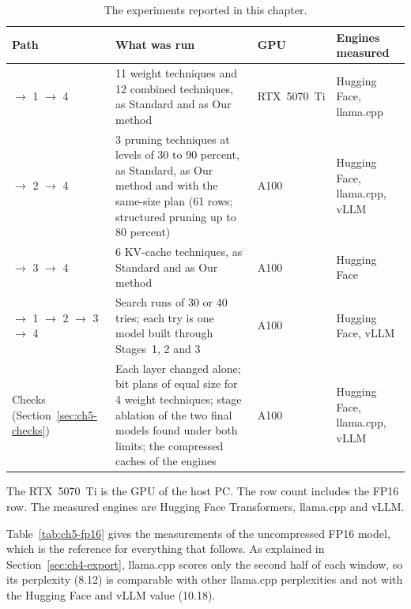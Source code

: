 \documentclass[
11pt, %
english, %
singlespacing, %
headsepline, %
]{MastersDoctoralThesis} %
\begin{document}
\begin{table}[htbp]
\centering
\small
\caption{The experiments reported in this chapter.}
\label{tab:ch5-experiments}
\renewcommand{\arraystretch}{1.2}
\begin{tabularx}{\textwidth}{>{\raggedright\arraybackslash}p{2.9cm}X>{\raggedright\arraybackslash}p{1.7cm}>{\raggedright\arraybackslash}p{2.7cm}}
\hline
\textbf{Path} & \textbf{What was run} & \textbf{GPU} & \textbf{Engines measured} \\
\hline
0 $\rightarrow$ 1 $\rightarrow$ 4 & 11 weight techniques and 12 combined techniques, as Standard and as Our method & RTX~5070~Ti & Hugging Face, llama.cpp \\
0 $\rightarrow$ 2 $\rightarrow$ 4 & 3 pruning techniques at levels of 30 to 90 percent, as Standard, as Our method and with the same-size plan (61 rows; structured pruning up to 80 percent) & A100 & Hugging Face, llama.cpp, vLLM \\
0 $\rightarrow$ 3 $\rightarrow$ 4 & 6 KV-cache techniques, as Standard and as Our method & A100 & Hugging Face \\
0 $\rightarrow$ 1 $\rightarrow$ 2 $\rightarrow$ 3 $\rightarrow$ 4 & Search runs of 30 or 40 tries; each try is one model built through Stages~1, 2 and 3 & A100 & Hugging Face, vLLM \\
Checks (Section~\ref{sec:ch5-checks}) & Each layer changed alone; bit plans of equal size for 4 weight techniques; stage ablation of the two final models found under both limits; the compressed caches of the engines & A100 & Hugging Face, llama.cpp, vLLM \\
\hline
\end{tabularx}
\end{table}

The RTX~5070~Ti is the GPU of the host PC. The row count includes the FP16 row. The measured engines are Hugging Face Transformers, llama.cpp and vLLM.

Table~\ref{tab:ch5-fp16} gives the measurements of the uncompressed FP16 model, which is the reference for everything that follows. As explained in Section~\ref{sec:ch4-export}, llama.cpp scores only the second half of each window, so its perplexity (8.12) is comparable with other llama.cpp perplexities and not with the Hugging Face and vLLM value (10.18).
\end{document}
